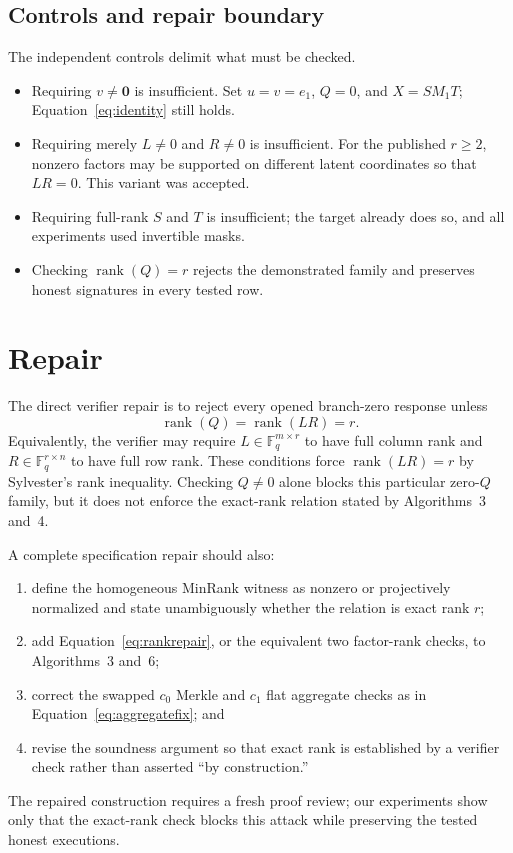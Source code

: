 \documentclass[10pt,a4paper]{article}
\newcommand{\F}{\mathbb{F}}
\newcommand{\rank}{\operatorname{rank}}
\newcommand{\vectzero}{\boldsymbol{0}}
\begin{document}
\subsection{Controls and repair boundary}

The independent controls delimit what must be checked.
\begin{itemize}
  \item Requiring $v\ne\vectzero$ is insufficient.  Set
  $u=v=e_1$, $Q=0$, and $X=SM_1T$; Equation~\eqref{eq:identity} still holds.
  \item Requiring merely $L\ne0$ and $R\ne0$ is insufficient.  For the
  published $r\ge2$, nonzero factors may be supported on different latent
  coordinates so that $LR=0$.  This variant was accepted.
  \item Requiring full-rank $S$ and $T$ is insufficient; the target already
  does so, and all experiments used invertible masks.
  \item Checking $\rank(Q)=r$ rejects the demonstrated family and preserves
  honest signatures in every tested row.
\end{itemize}

\section{Repair}

The direct verifier repair is to reject every opened branch-zero response
unless
\begin{equation}
  \rank(Q)=\rank(LR)=r.
  \label{eq:rankrepair}
\end{equation}
Equivalently, the verifier may require $L\in\F_q^{m\times r}$ to have full
column rank and $R\in\F_q^{r\times n}$ to have full row rank.  These conditions
force $\rank(LR)=r$ by Sylvester's rank inequality.  Checking $Q\ne0$ alone
blocks this particular zero-$Q$ family, but it does not enforce the exact-rank
relation stated by Algorithms~3 and~4.

A complete specification repair should also:
\begin{enumerate}
  \item define the homogeneous MinRank witness as nonzero or projectively
  normalized and state unambiguously whether the relation is exact rank $r$;
  \item add Equation~\eqref{eq:rankrepair}, or the equivalent two factor-rank
  checks, to Algorithms~3 and~6;
  \item correct the swapped $c_0$ Merkle and $c_1$ flat aggregate checks as in
  Equation~\eqref{eq:aggregatefix}; and
  \item revise the soundness argument so that exact rank is established by a
  verifier check rather than asserted ``by construction.''
\end{enumerate}
The repaired construction requires a fresh proof review; our experiments
show only that the exact-rank check blocks this attack while preserving the
tested honest executions.
\end{document}
